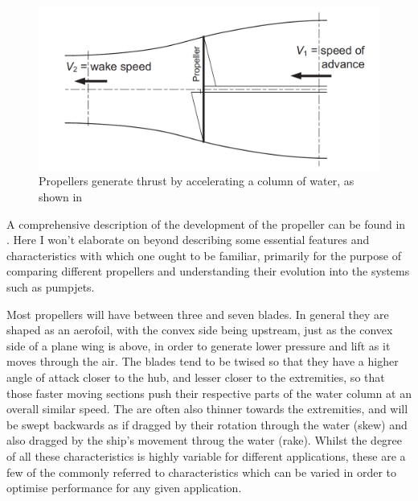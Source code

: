 \documentclass{article}\usepackage[]{graphicx}\usepackage[]{color}
\begin{document}
\begin{figure}
\includegraphics[width=\textwidth]{PropellerAction.png}
\caption{Propellers generate thrust by accelerating a column of water, as shown in  \parencite[247]{mollard2011}}
\label{fig:PropellerAction.png}
\end{figure}


A comprehensive description of the development of the propeller can be found in \cite{carlton2007}.  Here I won't elaborate on beyond describing some essential features and characteristics with which one ought to be familiar, primarily for the purpose of comparing different propellers and understanding their evolution into the systems such as pumpjets.

Most propellers will have between three and seven blades.  In general they are shaped as an aerofoil, with the convex side being upstream, just as the convex side of a plane wing is above, in order to generate lower pressure and lift as it moves through the air.  The blades tend to be twised so that they have a higher angle of attack closer to the hub, and lesser closer to the extremities, so that those faster moving sections push their respective parts of the water column at an overall similar speed.  The are often also thinner towards the extremities, and will be swept backwards as if dragged by their rotation through the water (skew) and also dragged by the ship's movement throug the water (rake). Whilst the degree of all these characteristics is highly variable for different applications, these are a few of the commonly referred to characteristics which can be varied in order to optimise performance for any given application.
\end{document}
